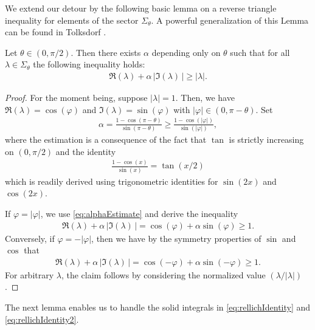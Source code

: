 We extend our detour by the following basic lemma on a reverse triangle inequality for elements of the sector $\Sigma_\theta$.
A powerful generalization of this Lemma can be found in Tolksdorf \cite[Lem. 5.2.4]{tolksdorf}.

\begin{lem}
  \label{lem:lambdaIneq}
  Let $\theta \in (0,\pi/2)$.
  Then there exists $\alpha$ depending only on $\theta$ such that for all $\lambda \in \Sigma_\theta$ the following inequality holds:
  \begin{align*}
    \Re(\lambda) + \alpha \, \big|\Im(\lambda)\,\big| \geq |\lambda|.
  \end{align*}
\end{lem}

\begin{proof}
  For the moment being, suppose $|\lambda| = 1$.
  Then, we have $\Re(\lambda) = \cos(\varphi)$ and $\Im(\lambda) = \sin(\varphi)$ with $|\varphi| \in (0, \pi - \theta)$. 
  Set
  \begin{align}
    \label{eq:alphaEstimate}
    \alpha = \frac{1 - \cos(\pi - \theta)}{\sin(\pi - \theta)} \geq \frac{1 - \cos(|\varphi|)}{\sin(|\varphi|)},
  \end{align}
  where the estimation is a consequence of the fact that $\tan$ is strictly increasing on $(0, \pi/2)$ and the identity 
  \begin{align*}
    \frac{1 - \cos(x)}{\sin(x)} = \tan(x/2)
  \end{align*}
  which is readily derived using trigonometric identities for $\sin(2x)$ and $\cos(2x)$.

  If $\varphi = |\varphi|$, we use \eqref{eq:alphaEstimate} and derive the inequality
  \begin{align*}
    \Re(\lambda) + \alpha \, |\Im(\lambda)\,| = \cos(\varphi) + \alpha \sin(\varphi) \geq 1.
  \end{align*}
  Conversely, if $\varphi = -|\varphi|$, then we have by the symmetry properties of $\sin$ and $\cos$ that
  \begin{align*}
    \Re(\lambda) + \alpha\, |\Im(\lambda)\,| = \cos(-\varphi) + \alpha \sin(-\varphi) \geq 1.
  \end{align*}
  For arbitrary $\lambda$, the claim follows by considering the normalized value $(\lambda / |\lambda|)$.
\end{proof}

The next lemma enables us to handle the solid integrals in \eqref{eq:rellichIdentity} and \eqref{eq:rellichIdentity2}.

